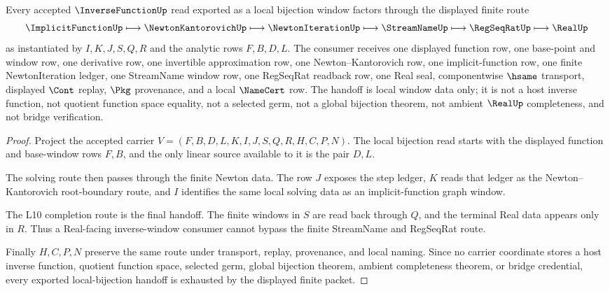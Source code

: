 \begin{theorem}\label{thm:inverse-function-local-bijection-handoff}
Every accepted $\InverseFunctionUp$ read exported as a local bijection window factors through the displayed finite route
$$
\ImplicitFunctionUp \longmapsto \NewtonKantorovichUp \longmapsto \NewtonIterationUp \longmapsto \StreamNameUp \longmapsto \RegSeqRatUp \longmapsto \RealUp
$$
as instantiated by $I,K,J,S,Q,R$ and the analytic rows $F,B,D,L$. The consumer receives one displayed function row, one base-point and window row, one derivative row, one invertible approximation row, one Newton--Kantorovich row, one implicit-function row, one finite NewtonIteration ledger, one StreamName window row, one RegSeqRat readback row, one Real seal, componentwise $\hsame$ transport, displayed $\Cont$ replay, $\Pkg$ provenance, and a local $\NameCert$ row. The handoff is local window data only; it is not a host inverse function, not quotient function space equality, not a selected germ, not a global bijection theorem, not ambient $\RealUp$ completeness, and not bridge verification.
\end{theorem}
\begin{proof}
Project the accepted carrier $V=(F,B,D,L,K,I,J,S,Q,R,H,C,P,N)$. The local bijection read starts with the displayed function and base-window rows $F,B$, and the only linear source available to it is the pair $D,L$.

The solving route then passes through the finite Newton data. The row $J$ exposes the step ledger, $K$ reads that ledger as the Newton--Kantorovich root-boundary route, and $I$ identifies the same local solving data as an implicit-function graph window.

The L10 completion route is the final handoff. The finite windows in $S$ are read back through $Q$, and the terminal Real data appears only in $R$. Thus a Real-facing inverse-window consumer cannot bypass the finite StreamName and RegSeqRat route.

Finally $H,C,P,N$ preserve the same route under transport, replay, provenance, and local naming. Since no carrier coordinate stores a host inverse function, quotient function space, selected germ, global bijection theorem, ambient completeness theorem, or bridge credential, every exported local-bijection handoff is exhausted by the displayed finite packet.
\end{proof}


